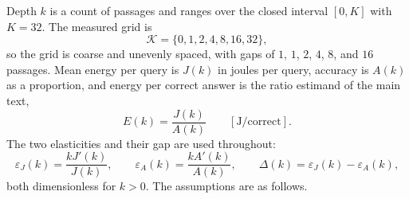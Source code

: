 Depth $k$ is a count of passages and ranges over the closed interval $[0,K]$ with
$K=32$. The measured grid is
\begin{equation}\label{app:eq:grid}
  \mathcal{K}=\{0,1,2,4,8,16,32\},
\end{equation}
so the grid is coarse and unevenly spaced, with gaps of $1$, $1$, $2$, $4$, $8$,
and $16$ passages. Mean energy per query is $J(k)$ in joules per query, accuracy
is $A(k)$ as a proportion, and energy per correct answer is the ratio estimand of
the main text,
\begin{equation}\label{app:eq:ratio}
  E(k)=\frac{J(k)}{A(k)}
  \qquad [\mathrm{J/correct}].
\end{equation}
The two elasticities and their gap are used throughout:
\begin{equation}\label{app:eq:elasticities}
  \varepsilon_{J}(k)=\frac{kJ'(k)}{J(k)},
  \qquad
  \varepsilon_{A}(k)=\frac{kA'(k)}{A(k)},
  \qquad
  \Delta(k)=\varepsilon_{J}(k)-\varepsilon_{A}(k),
\end{equation}
both dimensionless for $k>0$. The assumptions are as follows.

